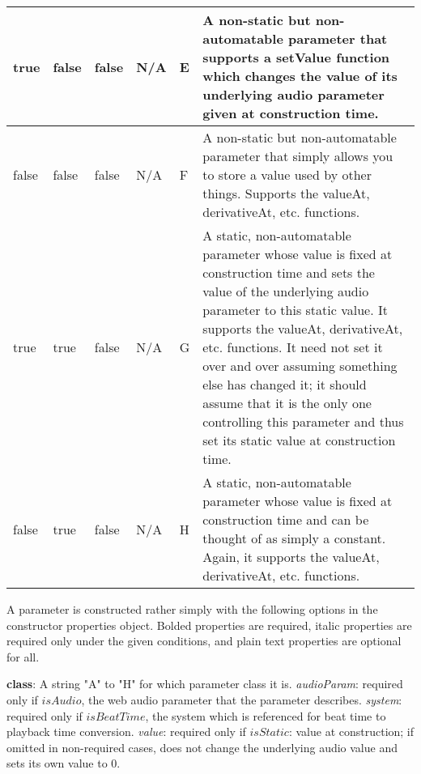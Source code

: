 \documentclass{article}
\begin{document}
\begin{longtable}{l|l|l|l|l|p{6cm}}
true & false & false & N/A & E & A non-static but non-automatable parameter that supports a setValue function which changes the value of its underlying audio parameter given at construction time. \\ \hline
false & false & false & N/A & F & A non-static but non-automatable parameter that simply allows you to store a value used by other things. Supports the valueAt, derivativeAt, etc. functions. \\ \hline
true & true & false & N/A & G & A static, non-automatable parameter whose value is fixed at construction time and sets the value of the underlying audio parameter to this static value. It supports the valueAt, derivativeAt, etc. functions. It need not set it over and over assuming something else has changed it; it should assume that it is the only one controlling this parameter and thus set its static value at construction time. \\ \hline
false & true & false & N/A & H & A static, non-automatable parameter whose value is fixed at construction time and can be thought of as simply a constant. Again, it supports the valueAt, derivativeAt, etc. functions. \\ \hline
\end{longtable}

A parameter is constructed rather simply with the following options in the constructor properties object. Bolded properties are required, italic properties are required only under the given conditions, and plain text properties are optional for all.

\textbf{class}: A string "A" to "H" for which parameter class it is.
\textit{audioParam}: required only if $isAudio$, the web audio parameter that the parameter describes.
\textit{system}: required only if $isBeatTime$, the system which is referenced for beat time to playback time conversion.
\textit{value}: required only if $isStatic$: value at construction; if omitted in non-required cases, does not change the underlying audio value and sets its own value to 0.
\end{document}
